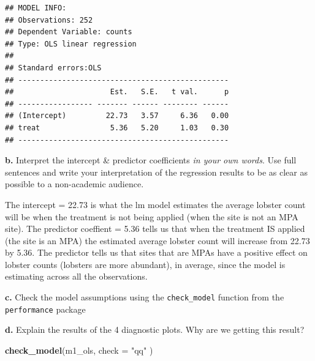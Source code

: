 \documentclass[
]{article}
\newenvironment{Shaded}{\begin{snugshade}}{\end{snugshade}}
\newcommand{\AttributeTok}[1]{\textcolor[rgb]{0.13,0.29,0.53}{#1}}
\newcommand{\FunctionTok}[1]{\textcolor[rgb]{0.13,0.29,0.53}{\textbf{#1}}}
\newcommand{\NormalTok}[1]{#1}
\newcommand{\StringTok}[1]{\textcolor[rgb]{0.31,0.60,0.02}{#1}}
\begin{document}
\begin{verbatim}
## MODEL INFO:
## Observations: 252
## Dependent Variable: counts
## Type: OLS linear regression 
## 
## Standard errors:OLS
## ------------------------------------------------
##                      Est.   S.E.   t val.      p
## ----------------- ------- ------ -------- ------
## (Intercept)         22.73   3.57     6.36   0.00
## treat                5.36   5.20     1.03   0.30
## ------------------------------------------------
\end{verbatim}

\textbf{b.} Interpret the intercept \& predictor coefficients \emph{in
your own words}. Use full sentences and write your interpretation of the
regression results to be as clear as possible to a non-academic
audience.

The intercept = 22.73 is what the lm model estimates the average lobster
count will be when the treatment is not being applied (when the site is
not an MPA site). The predictor coeffient = 5.36 tells us that when the
treatment IS applied (the site is an MPA) the estimated average lobster
count will increase from 22.73 by 5.36. The predictor tells us that
sites that are MPAs have a positive effect on lobster counts (lobsters
are more abundant), in average, since the model is estimating across all
the observations.

\textbf{c.} Check the model assumptions using the \texttt{check\_model}
function from the \texttt{performance} package

\textbf{d.} Explain the results of the 4 diagnostic plots. Why are we
getting this result?

\begin{Shaded}
\begin{Highlighting}[]
\FunctionTok{check\_model}\NormalTok{(m1\_ols, }\AttributeTok{check =} \StringTok{"qq"}\NormalTok{ )}
\end{Highlighting}
\end{Shaded}
\end{document}
